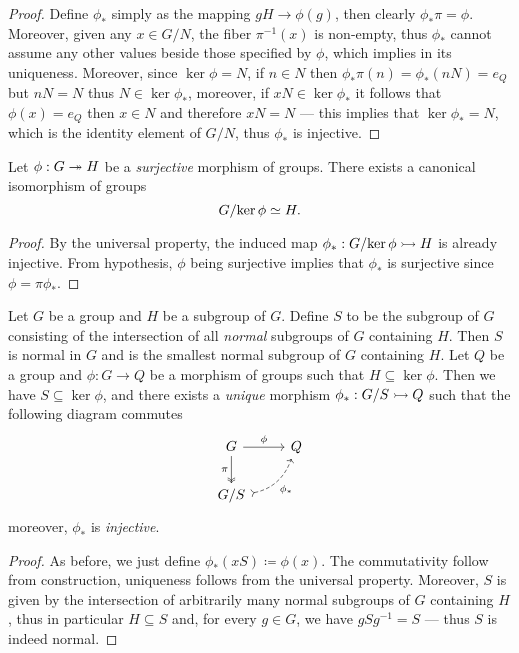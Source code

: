\begin{proof}
Define \(\phi_{*}\) simply as the mapping \(gH \to \phi(g)\), then clearly
\(\phi_{*} \pi = \phi\). Moreover, given any \(x \in G/N\), the fiber
\(\pi^{-1}(x)\) is non-empty, thus \(\phi_{*}\) cannot assume any other values
beside those specified by \(\phi\), which implies in its uniqueness. Moreover,
since \(\ker \phi = N\), if \(n \in N\) then
\(\phi_{*} \pi(n) = \phi_{*}(n N) = e_{Q}\) but \(n N = N\) thus
\(N \in \ker \phi_{*}\), moreover, if \(x N \in \ker \phi_{*}\) it follows that
\(\phi(x) = e_Q\) then \(x \in N\) and therefore \(x N = N\) --- this implies
that \(\ker \phi_{*} = N\), which is the identity element of \(G/N\), thus
\(\phi_{*}\) is injective.
\end{proof}

\begin{corollary}
\label{cor:first-iso-grp}
Let \(\phi: G \twoheadrightarrow H\) be a \emph{surjective} morphism of groups. There exists a
canonical isomorphism of groups
\[
G/{\ker \phi} \simeq H.
\]
\end{corollary}

\begin{proof}
By the universal property, the induced map \(\phi_{*}: G/{\ker \phi} \rightarrowtail H\)
is already injective. From hypothesis, \(\phi\) being surjective implies that
\(\phi_{*}\) is surjective since \(\phi = \pi \phi_{*}\).
\end{proof}

\begin{corollary}
\label{cor:universal-property-quotients-grp}
Let \(G\) be a group and \(H\) be a subgroup of \(G\). Define \(S\) to be the
subgroup of \(G\) consisting of the intersection of all \emph{normal} subgroups
of \(G\) containing \(H\). Then \(S\) is normal in \(G\) and is the smallest
normal subgroup of \(G\) containing \(H\). Let \(Q\) be a group and
\(\phi: G \to Q\) be a morphism of groups such that \(H \subseteq \ker
\phi\). Then we have \(S \subseteq \ker \phi\), and there exists a \emph{unique}
morphism \(\phi_{*}: G/S \rightarrowtail Q\) such that the following diagram commutes
\[
  \begin{tikzcd}
    G \ar[d, two heads, swap, "\pi"] \ar[r, "\phi"] &Q \\
    G/S \ar[ur, dashed, swap, bend right, tail, "\phi_{*}"] &
  \end{tikzcd}
\]
moreover, \(\phi_{*}\) is \emph{injective}.
\end{corollary}

\begin{proof}
As before, we just define \(\phi_{*}(x S) \coloneq \phi(x)\). The commutativity
follow from construction, uniqueness follows from the universal
property. Moreover, \(S\) is given by the intersection of arbitrarily many
normal subgroups of \(G\) containing \(H\), thus in particular \(H \subseteq S\)
and, for every \(g \in G\), we have \(g S g^{-1} = S\) --- thus \(S\) is indeed
normal.
\end{proof}

